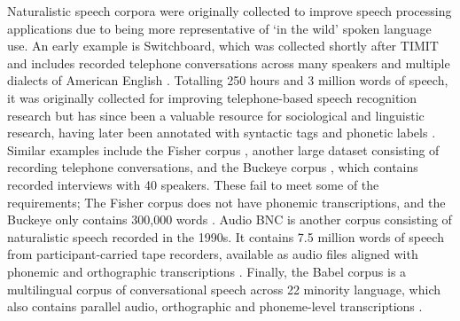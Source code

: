 Naturalistic speech corpora were originally collected to improve speech processing applications due to being more representative of `in the wild' spoken language use. An early example is Switchboard, which was collected shortly after TIMIT and includes recorded telephone conversations across many speakers and multiple dialects of American English \citep{godfrey1992switchboard}. Totalling 250 hours and 3 million words of speech, it was originally collected for improving telephone-based speech recognition research but has since been a valuable resource for sociological and linguistic research, having later been annotated with syntactic tags and phonetic labels \rough{[citations]}. Similar examples include the Fisher corpus \citep{cieri2004fisher}, another large dataset consisting of recording telephone conversations, and the Buckeye corpus \citep{pitt2007buckeye}, which contains recorded interviews with 40 speakers. These fail to meet some of the requirements; The Fisher corpus does not have phonemic transcriptions, and the Buckeye only contains 300,000 words \citep{pitt2007buckeye}. Audio BNC is another corpus consisting of naturalistic speech recorded in the 1990s. It contains 7.5 million words of speech from participant-carried tape recorders, available as audio files aligned with phonemic and orthographic transcriptions \citep{coleman2012audio}. Finally, the Babel corpus is a multilingual corpus of conversational speech across 22 minority language, which also contains parallel audio, orthographic and phoneme-level transcriptions \citep{gales2014speech}. 


